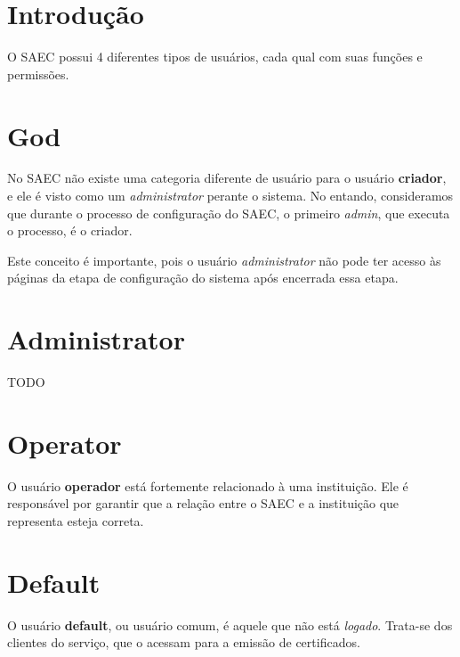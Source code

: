 
\section{Introdução}
O SAEC possui 4 diferentes tipos de usuários, cada qual com suas funções e permissões.


\section{God}
No SAEC não existe uma categoria diferente de usuário para o usuário \textbf{criador}, e ele é visto como um \textit{administrator} perante o sistema. No entando, consideramos que durante o processo de configuração do SAEC, o primeiro \textit{admin}, que executa o processo, é o criador.

Este conceito é importante, pois o usuário \textit{administrator} não pode ter acesso às páginas da etapa de configuração do sistema após encerrada essa etapa.


\section{Administrator}
TODO


\section{Operator}
O usuário \textbf{operador} está fortemente relacionado à uma instituição. Ele é responsável por garantir que a relação entre o SAEC e a instituição que representa esteja correta.


\section{Default}
O usuário \textbf{default}, ou usuário comum, é aquele que não está \textit{logado}. Trata-se dos clientes do serviço, que o acessam para a emissão de certificados.